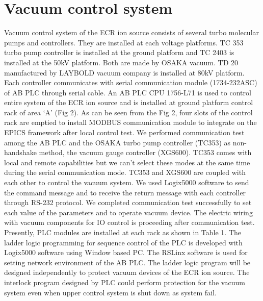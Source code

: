 \documentclass[a4paper,
              ]{jacow}
\begin{document}
\section{Vacuum control system}
Vacuum control system of the ECR ion source consists of several turbo molecular pumps and controllers. They are installed at each voltage platforms. TC 353 turbo pump controller is installed at the ground platform and TC 2403 is installed at the 50kV platform. Both are made by OSAKA vacuum. TD 20 manufactured by LAYBOLD vacuum company is installed at 80kV platform. Each controller communicates with serial communication module (1734-232ASC) of AB PLC through serial cable.   
An AB PLC CPU 1756-L71 is used to control entire system of the ECR ion source and is installed at ground platform control rack of area ‘A’ (Fig 2). As can be seen from the Fig 2, four slots of the control rack are emptied to install MODBUS communication module to integrate on the EPICS framework after local control test. We performed communication test among the AB PLC and the OSAKA turbo pump controller (TC353) as non-handshake method, the vacuum gauge controller (XGS600). TC353 comes with local and remote capabilities but we can’t select these modes at the same time during the serial communication mode. TC353 and XGS600 are coupled with each other to control the vacuum system. We used Logix5000 software to send the command message and to receive the return message with each controller through RS-232 protocol. We completed communication test successfully to set each value of the parameters and to operate vacuum device.  
The electric wiring with vacuum components for IO control is proceeding after communication test. Presently, PLC modules are installed at each rack as shown in Table 1.
The ladder logic programming for sequence control of the PLC is developed with Logix5000 software using Window based PC. The RSLinx software is used for setting network environment of the AB PLC. The ladder logic program will be designed independently to protect vacuum devices of the ECR ion source. The interlock program designed by PLC could perform protection for the vacuum system even when upper control system is shut down as system fail.
\end{document}
